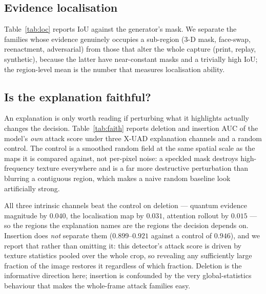 \documentclass[conference]{IEEEtran}
\begin{document}
\subsection{Evidence localisation}
Table~\ref{tab:loc} reports IoU against the generator's mask. We separate the
families whose evidence genuinely occupies a sub-region (3-D mask, face-swap,
reenactment, adversarial) from those that alter the whole capture (print, replay,
synthetic), because the latter have near-constant masks and a trivially high IoU;
the region-level mean is the number that measures localisation ability.

\begin{table}[t]
\centering
\caption{Spoof-evidence localisation, IoU (\%) against the generator mask,
protocol P1. ResNet-18 and ViT-Tiny have no localisation output.}
\label{tab:loc}
\small
\resizebox{\linewidth}{!}{}
\end{table}

\subsection{Is the explanation faithful?}
An explanation is only worth reading if perturbing what it highlights actually
changes the decision. Table~\ref{tab:faith} reports deletion and insertion AUC
\cite{petsiuk2018rise} of the model's \emph{own} attack score under three X-UAD
explanation channels and a random control. The control is a smoothed random field
at the same spatial scale as the maps it is compared against, not per-pixel noise:
a speckled mask destroys high-frequency texture everywhere and is a far more
destructive perturbation than blurring a contiguous region, which makes a naive
random baseline look artificially strong.

All three intrinsic channels beat the control on deletion --- quantum evidence
magnitude by $0.040$, the localisation map by $0.031$, attention rollout by
$0.015$ --- so the regions the explanation names are the regions the decision
depends on. Insertion does \emph{not} separate them ($0.899$--$0.921$ against a
control of $0.946$), and we report that rather than omitting it: this detector's
attack score is driven by texture statistics pooled over the whole crop, so
revealing any sufficiently large fraction of the image restores it regardless of
which fraction. Deletion is the informative direction here; insertion is
confounded by the very global-statistics behaviour that makes the whole-frame
attack families easy.
\end{document}
